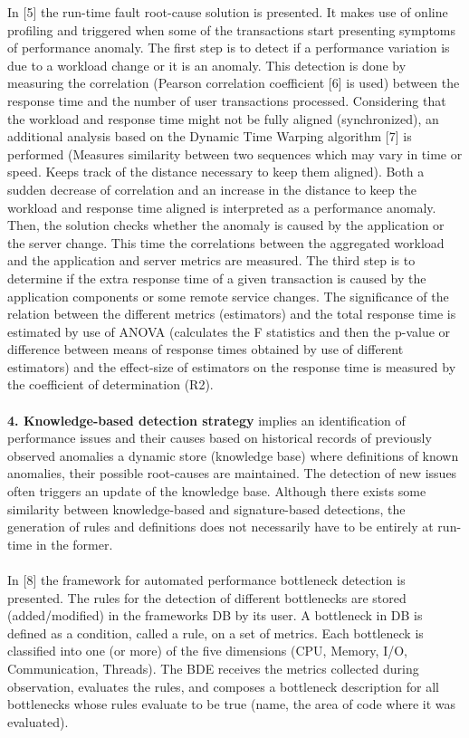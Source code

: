 \documentclass[]{usiinfprospectus}
\begin{document}
In [5] the run-time fault root-cause solution is presented. It makes use of online profiling and triggered when some of the transactions start presenting symptoms of performance anomaly. The first step is to detect if a performance variation is due to a workload change or it is an anomaly. This detection is done by measuring the correlation (Pearson correlation coefficient [6] is used) between the response time and the number of user transactions processed. Considering that the workload and response time might not be fully aligned (synchronized), an additional analysis based on the Dynamic Time Warping algorithm [7] is performed (Measures similarity between two sequences which may vary in time or speed. Keeps track of the distance necessary to keep them aligned). Both a sudden decrease of correlation and an increase in the distance to keep the workload and response time aligned is interpreted as a performance anomaly. Then, the solution checks whether the anomaly is caused by the application or the server change. This time the correlations between the aggregated workload and the application and server metrics are measured. The third step is to determine if the extra response time of a given transaction is caused by the application components or some remote service changes. The significance of the relation between the different metrics (estimators) and the total response time is estimated by use of ANOVA (calculates the F statistics and then the p-value or difference between means of response times obtained by use of different estimators) and the effect-size of estimators on the response time is measured by the coefficient of determination (R2).\\\\
%
\textbf{4. Knowledge-based detection strategy} implies an identification of performance issues and their causes based on historical records of previously observed anomalies a dynamic store (knowledge base) where definitions of known anomalies, their possible root-causes are maintained. The detection of new issues often triggers an update of the knowledge base. Although there exists some similarity between knowledge-based and signature-based detections, the generation of rules and definitions does not necessarily have to be entirely at run-time in the former.\\\\
In [8] the framework for automated performance bottleneck detection is presented. The rules for the detection of different bottlenecks are stored (added/modified) in the frameworks DB by its user. A bottleneck in DB is defined as a condition, called a rule, on a set of metrics. Each bottleneck is classified into one (or more) of the five dimensions (CPU, Memory, I/O, Communication, Threads). The BDE receives the metrics collected during observation, evaluates the rules, and composes a bottleneck description for all bottlenecks whose rules evaluate to be true (name, the area of code where it was evaluated).\\\\
\end{document}
